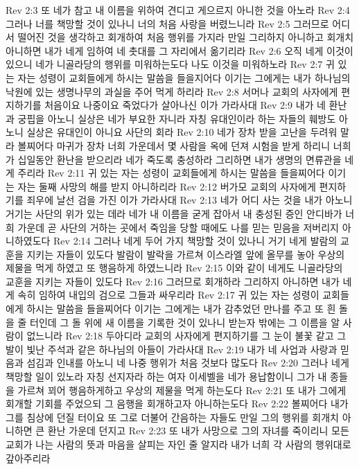 Rev 2:3  또 네가 참고 내 이름을 위하여 견디고 게으르지 아니한 것을 아노라
Rev 2:4  그러나 너를 책망할 것이 있나니 너의 처음 사랑을 버렸느니라
Rev 2:5  그러므로 어디서 떨어진 것을 생각하고 회개하여 처음 행위를 가지라 만일 그리하지 아니하고 회개치 아니하면 내가 네게 임하여 네 촛대를 그 자리에서 옮기리라
Rev 2:6  오직 네게 이것이 있으니 네가 니골라당의 행위를 미워하는도다 나도 이것을 미워하노라
Rev 2:7  귀 있는 자는 성령이 교회들에게 하시는 말씀을 들을지어다 이기는 그에게는 내가 하나님의 낙원에 있는 생명나무의 과실을 주어 먹게 하리라
Rev 2:8  서머나 교회의 사자에게 편지하기를 처음이요 나중이요 죽었다가 살아나신 이가 가라사대
Rev 2:9  내가 네 환난과 궁핍을 아노니 실상은 네가 부요한 자니라 자칭 유대인이라 하는 자들의 훼방도 아노니 실상은 유대인이 아니요 사단의 회라
Rev 2:10  네가 장차 받을 고난을 두려워 말라 볼찌어다 마귀가 장차 너희 가운데서 몇 사람을 옥에 던져 시험을 받게 하리니 너희가 십일동안 환난을 받으리라 네가 죽도록 충성하라 그리하면 내가 생명의 면류관을 네게 주리라
Rev 2:11  귀 있는 자는 성령이 교회들에게 하시는 말씀을 들을찌어다 이기는 자는 둘째 사망의 해를 받지 아니하리라
Rev 2:12  버가모 교회의 사자에게 편지하기를 죄우에 날선 검을 가진 이가 가라사대
Rev 2:13  네가 어디 사는 것을 내가 아노니 거기는 사단의 위가 있는 데라 네가 내 이름을 굳게 잡아서 내 충성된 증인 안디바가 너희 가운데 곧 사단의 거하는 곳에서 죽임을 당할 때에도 나를 믿는 믿음을 저버리지 아니하였도다
Rev 2:14  그러나 네게 두어 가지 책망할 것이 있나니 거기 네게 발람의 교훈을 지키는 자들이 있도다 발람이 발락을 가르쳐 이스라엘 앞에 올무를 놓아 우상의 제물을 먹게 하였고 또 행음하게 하였느니라
Rev 2:15  이와 같이 네게도 니골라당의 교훈을 지키는 자들이 있도다
Rev 2:16  그러므로 회개하라 그리하지 아니하면 내가 네게 속히 임하여 내입의 검으로 그들과 싸우리라
Rev 2:17  귀 있는 자는 성령이 교회들에게 하시는 말씀을 들을찌어다 이기는 그에게는 내가 감추었던 만나를 주고 또 흰 돌을 줄 터인데 그 돌 위에 새 이름을 기록한 것이 있나니 받는자 밖에는 그 이름을 알 사람이 없느니라
Rev 2:18  두아디라 교회의 사자에게 편지하기를 그 눈이 불꽃 같고 그 발이 빛난 주석과 같은 하나님의 아들이 가라사대
Rev 2:19  내가 네 사업과 사랑과 믿음과 섬김과 인내를 아노니 네 나중 행위가 처음 것보다 많도다
Rev 2:20  그러나 네게 책망할 일이 있노라 자칭 선지자라 하는 여자 이세벨을 네가 용납함이니 그가 내 종들을 가르쳐 꾀어 행음하게하고 우상의 제물을 먹게 하는도다
Rev 2:21  또 내가 그에게 회개할 기회를 주었으되 그 음행을 회개하고자 아니하는도다
Rev 2:22  볼찌어다 내가 그를 침상에 던질 터이요 또 그로 더불어 간음하는 자들도 만일 그의 행위를 회개치 아니하면 큰 환난 가운데 던지고
Rev 2:23  또 내가 사망으로 그의 자녀를 죽이리니 모든 교회가 나는 사람의 뜻과 마음을 살피는 자인 줄 알지라 내가 너희 각 사람의 행위대로 갚아주리라
